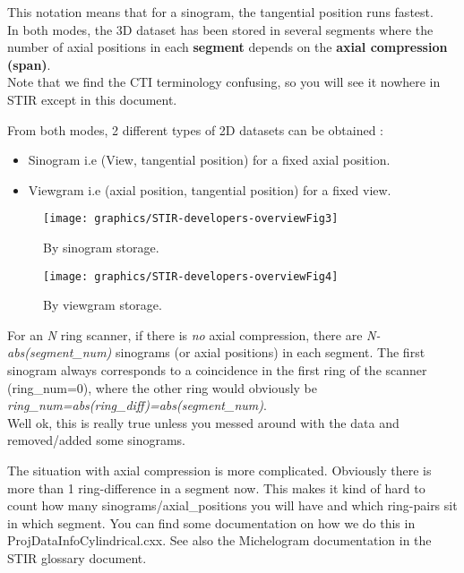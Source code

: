 \documentclass{article}
\begin{document}
This notation means that for a sinogram, the tangential position 
runs fastest.\\
In both modes, the 3D dataset has been stored in several segments 
where the number of axial positions in each \textbf{segment} depends 
on the \textbf{axial compression (span)}.\\
Note that we find the CTI terminology confusing, so you will 
see it nowhere in STIR except in this document.


From both modes, 2 different types of 2D datasets can be obtained 
:
\begin{itemize}
\item Sinogram i.e (View, tangential position) for a fixed axial 
position.
\item Viewgram i.e (axial position, tangential position) for a fixed 
view.
\end{itemize} 


\begin{figure}[htbp]
\begin{center}
\texttt{[image: graphics/STIR-developers-overviewFig3]}
\caption{By sinogram storage.}
\label{fig:sinogramstorage}
\end{center}
\end{figure}

\begin{figure}[htbp]
\begin{center}
\texttt{[image: graphics/STIR-developers-overviewFig4]}
\caption{By viewgram storage.}
\label{fig:viewgramstorage}
\end{center}
\end{figure}


For an \textit{N} ring scanner, if there is \textit{no} axial compression, 
there are \textit{N-abs(segment\_num)}  sinograms (or axial positions) 
in each segment. The first sinogram always corresponds to a coincidence 
in the first ring of the scanner (ring\_num=0), where the other 
ring would obviously be \textit{ring\_num=abs(ring\_diff)=abs(segment\_num)}. 
\\
Well ok, this is really true unless you messed around with the 
data and removed/added some sinograms. 

The situation with axial compression is more complicated. 
Obviously there is more than 1 ring-difference in a segment now. 
This makes it kind of hard to count how many sinograms/axial\_positions 
you will have and which ring-pairs sit in which segment. You 
can find some documentation on how we do this in ProjDataInfoCylindrical.cxx. 
See also the Michelogram documentation in the STIR glossary document. 
\end{document}
